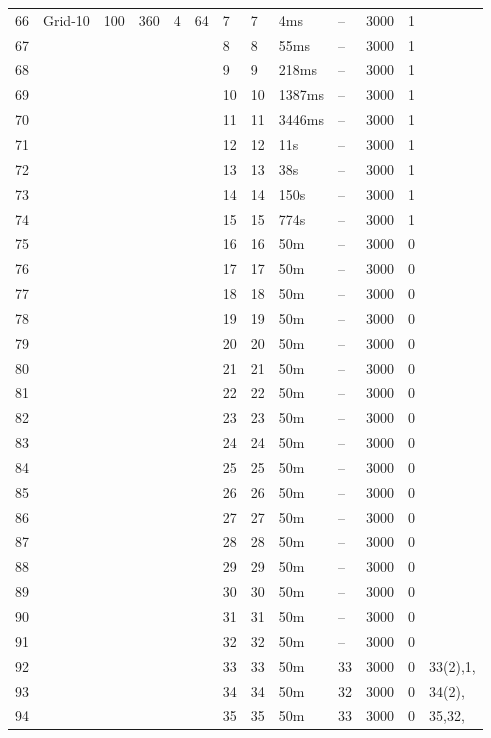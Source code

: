 \documentclass{article}
\begin{document}
\begin{longtable}{|l |l |l |l |l |l |l |l |l |l |l |l |l |}
66&Grid-10&100&360&4&64&7&7&4ms&--&3000&1&\\
67&&&&&&8&8&55ms&--&3000&1&\\
68&&&&&&9&9&218ms&--&3000&1&\\
69&&&&&&10&10&1387ms&--&3000&1&\\
70&&&&&&11&11&3446ms&--&3000&1&\\
71&&&&&&12&12&11s&--&3000&1&\\
72&&&&&&13&13&38s&--&3000&1&\\
73&&&&&&14&14&150s&--&3000&1&\\
74&&&&&&15&15&774s&--&3000&1&\\
75&&&&&&16&16&50m&--&3000&0&\\
76&&&&&&17&17&50m&--&3000&0&\\
77&&&&&&18&18&50m&--&3000&0&\\
78&&&&&&19&19&50m&--&3000&0&\\
79&&&&&&20&20&50m&--&3000&0&\\
80&&&&&&21&21&50m&--&3000&0&\\
81&&&&&&22&22&50m&--&3000&0&\\
82&&&&&&23&23&50m&--&3000&0&\\
83&&&&&&24&24&50m&--&3000&0&\\
84&&&&&&25&25&50m&--&3000&0&\\
85&&&&&&26&26&50m&--&3000&0&\\
86&&&&&&27&27&50m&--&3000&0&\\
87&&&&&&28&28&50m&--&3000&0&\\
88&&&&&&29&29&50m&--&3000&0&\\
89&&&&&&30&30&50m&--&3000&0&\\
90&&&&&&31&31&50m&--&3000&0&\\
91&&&&&&32&32&50m&--&3000&0&\\
92&&&&&&33&33&50m&33&3000&0&33(2),1,\\
93&&&&&&34&34&50m&32&3000&0&34(2),\\
94&&&&&&35&35&50m&33&3000&0&35,32,\\
\hline
\end{longtable}
\end{document}
